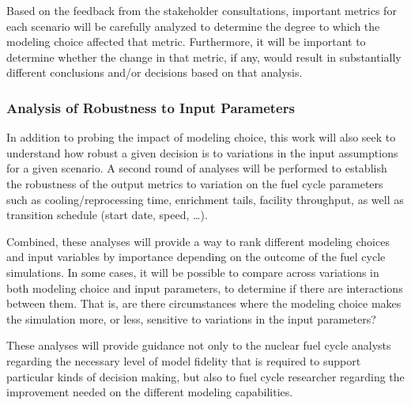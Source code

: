 Based on the feedback from the stakeholder consultations, important metrics
for each scenario will be carefully analyzed to determine the degree to which
the modeling choice affected that metric.  Furthermore, it will be important
to determine whether the change in that metric, if any, would result in
substantially different conclusions and/or decisions based on that analysis.

\subsubsection{Analysis of Robustness to Input Parameters}

In addition to probing the impact of modeling choice, this work will also seek
to understand how robust a given decision is to variations in the input
assumptions for a given scenario.  A second round of analyses will be performed
to establish the robustness of the output metrics to variation on the fuel cycle
parameters such as cooling/reprocessing time, enrichment tails, facility
throughput, as well as transition schedule (start date, speed, \dots).

Combined, these analyses will provide a way to rank different modeling choices
and input variables by importance depending on the outcome of the fuel cycle
simulations.  In some cases, it will be possible to compare across variations
in both modeling choice and input parameters, to determine if there are
interactions between them.  That is, are there circumstances where the
modeling choice makes the simulation more, or less, sensitive to variations in
the input parameters?

These analyses will provide guidance not only to the nuclear fuel cycle analysts
regarding the necessary level of model fidelity that is required to support
particular kinds of decision making, but also to fuel cycle researcher regarding
the improvement needed on the different modeling capabilities.
